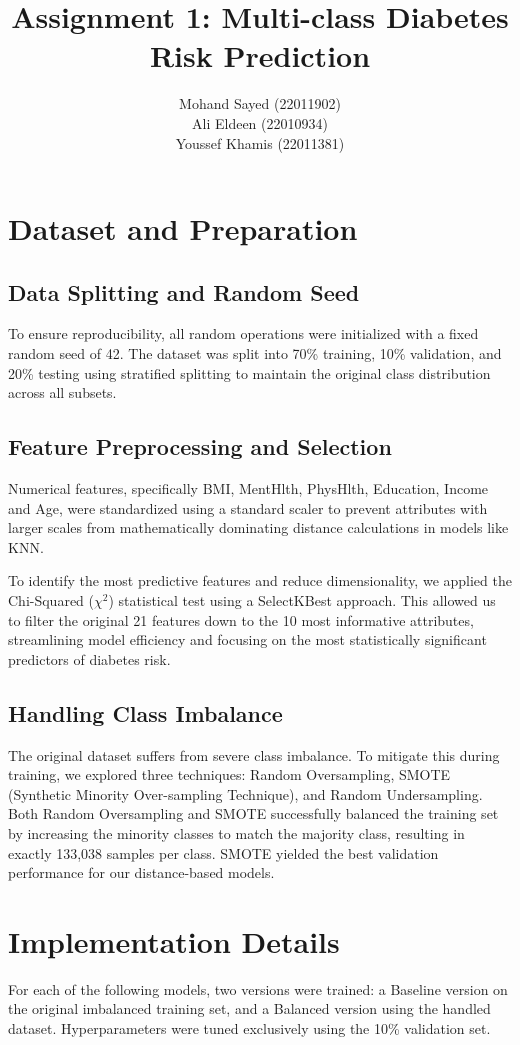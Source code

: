 \documentclass[12pt, a4paper]{article}
\title{
    \vspace{-2cm}
    \Large \textbf{Assignment 1: Multi-class Diabetes Risk Prediction}
}
\author{
    Mohand Sayed   (22011902) \\
    Ali Eldeen     (22010934) \\
    Youssef Khamis (22011381)
}
\date{}
\begin{document}
\maketitle

\section{Dataset and Preparation}
\subsection{Data Splitting and Random Seed}
To ensure reproducibility, all random operations were initialized with a fixed random seed of 42. The dataset was split into 70\% training, 10\% validation, and 20\% testing using stratified splitting to maintain the original class distribution across all subsets.

\subsection{Feature Preprocessing and Selection}
Numerical features, specifically BMI, MentHlth, PhysHlth, Education, Income and Age, were standardized using a standard scaler to prevent attributes with larger scales from mathematically dominating distance calculations in models like KNN. 

To identify the most predictive features and reduce dimensionality, we applied the Chi-Squared ($\chi^2$) statistical test using a SelectKBest approach. This allowed us to filter the original 21 features down to the 10 most informative attributes, streamlining model efficiency and focusing on the most statistically significant predictors of diabetes risk.

\subsection{Handling Class Imbalance}
The original dataset suffers from severe class imbalance. To mitigate this during training, we explored three techniques: Random Oversampling, SMOTE (Synthetic Minority Over-sampling Technique), and Random Undersampling. Both Random Oversampling and SMOTE successfully balanced the training set by increasing the minority classes to match the majority class, resulting in exactly 133,038 samples per class. SMOTE yielded the best validation performance for our distance-based models.

\section{Implementation Details}
For each of the following models, two versions were trained: a Baseline version on the original imbalanced training set, and a Balanced version using the handled dataset. Hyperparameters were tuned exclusively using the 10\% validation set.
\end{document}
